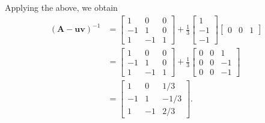 Applying the above, we obtain
\[
\begin{aligned}
	(\boldsymbol{A}-\boldsymbol{u v})^{-1} & =\left[\begin{array}{ccc}
		1 & 0 & 0 \\
		-1 & 1 & 0 \\
		1 & -1 & 1
	\end{array}\right]+\frac{1}{3}\left[\begin{array}{c}
		1 \\
		-1 \\
		-1
	\end{array}\right]\left[\begin{array}{lll}
		0 & 0 & 1
	\end{array}\right] \\
	& =\left[\begin{array}{ccc}
		1 & 0 & 0 \\
		-1 & 1 & 0 \\
		1 & -1 & 1
	\end{array}\right]+\frac{1}{3}\left[\begin{array}{ccc}
		0 & 0 & 1 \\
		0 & 0 & -1 \\
		0 & 0 & -1
	\end{array}\right] \\
	& =\left[\begin{array}{ccc}
		1 & 0 & 1 / 3 \\
		-1 & 1 & -1 / 3 \\
		1 & -1 & 2 / 3
	\end{array}\right] .
\end{aligned}
\]
